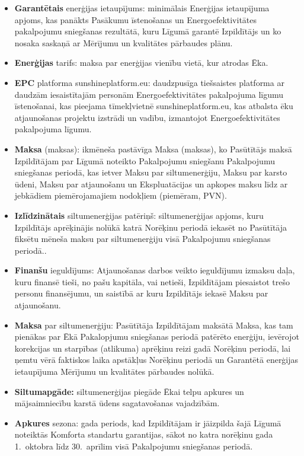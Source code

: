 \begin{multicols}{2}
\begin{itemize}[label={}]
	\item\textbf{Garantētais} enerģijas ietaupījums: minimālais Enerģijas ietaupījuma apjoms, kas panākts Pasākumu īstenošanas un Energoefektivitātes pakalpojumu sniegšanas rezultātā, kuru Līgumā garantē Izpildītājs un ko nosaka saskaņā ar Mērījumu un kvalitātes pārbaudes plānu.
	\item\textbf{Enerģijas} tarifs: maksa par enerģijas vienību vietā, kur atrodas Ēka.
	\item\textbf{EPC} platforma sunshineplatform.eu: daudzpusīga tiešsaistes platforma ar daudzām iesaistītajām personām Energoefektivitātes pakalpojuma līgumu īstenošanai, kas pieejama tīmekļvietnē sunshineplatform.eu, kas atbalsta ēku atjaunošanas projektu izstrādi un vadību, izmantojot Energoefektivitātes pakalpojuma līgumu.
	\item\textbf{Maksa} (maksas): ikmēneša pastāvīga Maksa (maksas), ko Pasūtītājs maksā Izpildītājam par Līgumā noteikto Pakalpojumu sniegšanu Pakalpojumu sniegšanas periodā, kas ietver Maksu par siltumenerģiju, Maksu par karsto ūdeni, Maksu par atjaunošanu un Ekspluatācijas un apkopes maksu līdz ar jebkādiem piemērojamajiem nodokļiem (piemēram, PVN).
	\item\textbf{Izlīdzinātais} siltumenerģijas patēriņš:  siltumenerģijas apjoms, kuru Izpildītājs aprēķinājis nolūkā katrā Norēķinu periodā iekasēt no Pasūtītāja fiksētu mēneša maksu par siltumenerģiju visā Pakalpojumu sniegšanas periodā..
	\item\textbf{Finanšu} ieguldījums: Atjaunošanas darbos veikto ieguldījumu izmaksu daļa, kuru finansē tieši, no pašu kapitāla, vai netieši, Izpildītājam piesaistot trešo personu finansējumu, un saistībā ar kuru Izpildītājs iekasē Maksu par atjaunošanu.
	\item\textbf{Maksa} par siltumenerģiju: Pasūtītāja Izpildītājam maksātā Maksa, kas tam pienākas par Ēkā Pakalopjumu sniegšanas periodā patērēto enerģiju, ievērojot korekcijas un starpības (atlikuma) aprēķinu reizi gadā Norēķinu periodā, lai ņemtu vērā faktiskos laika apstākļus Norēķinu periodā un Garantētā enerģijas ietaupījuma Mērījumu un kvalitātes pārbaudes nolūkā.
	\item\textbf{Siltumapgāde:} siltumenerģijas piegāde Ēkai telpu apkures un mājsaimniecību karstā ūdens sagatavošanas vajadzībām.
	\item\textbf{Apkures} sezona: gada periods, kad Izpildītājam ir jāizpilda šajā Līgumā noteiktās Komforta standartu garantijas, sākot no katra norēķinu gada 1.\ oktobra līdz 30.\ aprīlim visā Pakalpojumu sniegšanas periodā.

\end{itemize}
\end{multicols}
